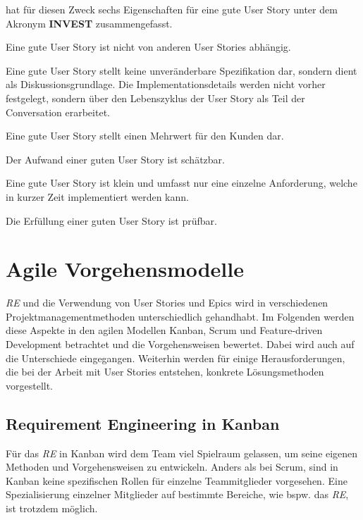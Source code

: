 \documentclass[acmtog]{acmart}
\begin{document}
\cite{wake_invest_2003} hat für diesen Zweck sechs Eigenschaften für eine gute User Story unter dem Akronym \textbf{INVEST} zusammengefasst.
\begin{description}[topsep=5pt]
	\item[Independent:] Eine gute User Story ist nicht von anderen User Stories abhängig.
	\item[Negotiable:] Eine gute User Story stellt keine unveränderbare Spezifikation dar, sondern dient als Diskussionsgrundlage.
		Die Implementationsdetails werden nicht vorher festgelegt, sondern über den Lebenszyklus der User Story als Teil der Conversation
		erarbeitet.
	\item[Valuable:] Eine gute User Story stellt einen Mehrwert für den Kunden dar.
	\item[Estimatable:] Der Aufwand einer guten User Story ist schätzbar.
	\item[Small:] Eine gute User Story ist klein und umfasst nur eine einzelne Anforderung, welche in kurzer Zeit implementiert werden kann.
	\item[Testable:] Die Erfüllung einer guten User Story ist prüfbar.
\end{description}


\section{Agile Vorgehensmodelle} \label{sec:agile-vorgehensmodelle}

\emph{RE} und die Verwendung von User Stories und Epics wird in verschiedenen Projektmanagementmethoden unterschiedlich gehandhabt. Im Folgenden werden
diese Aspekte in den agilen Modellen Kanban, Scrum und Feature-driven Development betrachtet und die Vorgehensweisen bewertet. Dabei wird auch auf die Unterschiede eingegangen.
Weiterhin werden für einige Herausforderungen, die bei der Arbeit mit User Stories entstehen, konkrete Lösungsmethoden vorgestellt.

\subsection{Requirement Engineering in Kanban}

Für das \emph{RE} in Kanban wird dem Team viel Spielraum gelassen,
um seine eigenen Methoden und Vorgehensweisen zu entwickeln. Anders als bei Scrum, sind
in Kanban keine spezifischen Rollen für einzelne Teammitglieder vorgesehen. Eine
Spezialisierung einzelner Mitglieder auf bestimmte Bereiche, wie bspw. das \emph{RE}, ist trotzdem
möglich.
\end{document}
